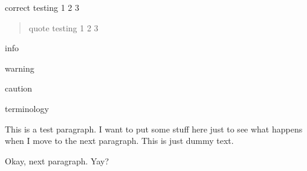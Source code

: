 \documentclass[letterpaper,11pt,oneside]{memoir}
\begin{document}
\begin{correct}
	correct testing 1 2 3
\end{correct}

\begin{quote}
	quote testing 1 2 3
\end{quote}
	
\begin{info}
	info
\end{info}

\begin{warning}
	warning
\end{warning}

\begin{caution}
	caution
\end{caution}

\begin{terminology}
	terminology
\end{terminology}	
	This is a test paragraph.  I want to put some stuff here just to see what happens when I move to the next paragraph.  This is just dummy text.
	
	Okay, next paragraph.  Yay?		
	\backmatter
\end{document}
